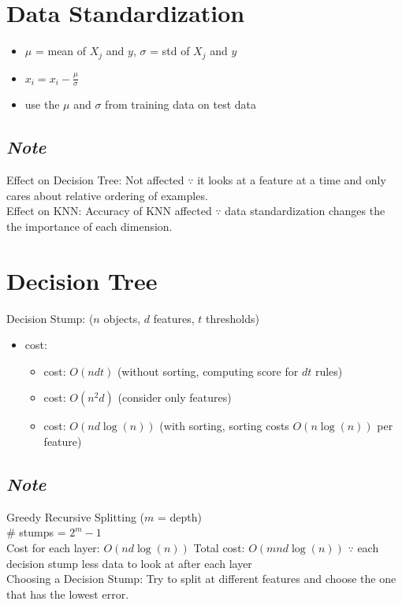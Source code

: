 \documentclass[10pt,landscape,a4paper]{article}
\begin{document}
\begin{multicols*}{5}
\section{Data Standardization}
\begin{itemize}
    \item \(\mu \) = mean of \(X_j\) and \(y\), \(\sigma \) = std of \(X_j\) and \(y\)
    \item \(x_i = x_i - \frac{\mu}{\sigma}\)
    \item use the \(\mu \) and \(\sigma \) from training data on test data
\end{itemize}

\subsection{\emph{Note}}
Effect on Decision Tree: Not affected \(\because \) it looks at a feature at a time and only cares about relative ordering of examples. \\
Effect on KNN: Accuracy of KNN affected \(\because \) data standardization changes the the importance of each dimension.

\section{Decision Tree}
Decision Stump: (\(n\) objects, \(d\) features, \(t\) thresholds)
\begin{itemize}
    \item cost:
    \begin{itemize}
        \item cost: \(O(ndt)\) (without sorting, computing score for \(dt\) rules)
        \item cost: \(O(n^2d)\) (consider only features)
        \item cost: \(O(nd \log(n))\) (with sorting, sorting costs \(O(n \log(n))\) per feature)
    \end{itemize}
\end{itemize}

\subsection{\emph{Note}}
Greedy Recursive Splitting (\(m\) = depth) \\
\# stumps = \(2^m - 1\) \\
Cost for each layer: \(O(nd\log(n))\)
Total cost: \(O(mnd\log(n))\) \(\because \) each decision stump less data to look at after each layer \\
Choosing a Decision Stump: Try to split at different features and choose the one that has the lowest error.


\end{multicols*}
\end{document}
